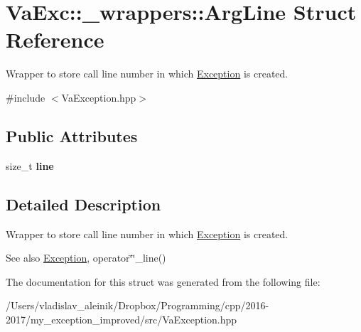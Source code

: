 \hypertarget{struct_va_exc_1_1__wrappers_1_1_arg_line}{}\section{Va\+Exc\+:\+:\+\_\+wrappers\+:\+:Arg\+Line Struct Reference}
\label{struct_va_exc_1_1__wrappers_1_1_arg_line}


Wrapper to store call line number in which \hyperlink{class_va_exc_1_1_exception}{Exception} is created.  




{\ttfamily \#include $<$Va\+Exception.\+hpp$>$}

\subsection*{Public Attributes}
\begin{DoxyCompactItemize}
\item 
\mbox{\label{struct_va_exc_1_1__wrappers_1_1_arg_line_acd4eea406c8d73c21ff7d14786ff980b}} 
size\+\_\+t {\bfseries line}
\end{DoxyCompactItemize}


\subsection{Detailed Description}
Wrapper to store call line number in which \hyperlink{class_va_exc_1_1_exception}{Exception} is created. 

\begin{DoxySeeAlso}{See also}
\hyperlink{class_va_exc_1_1_exception}{Exception}, operator\char`\"{}\char`\"{}\+\_\+line() 
\end{DoxySeeAlso}


The documentation for this struct was generated from the following file\+:\begin{DoxyCompactItemize}
\item 
/\+Users/vladislav\+\_\+aleinik/\+Dropbox/\+Programming/cpp/2016-\/2017/my\+\_\+exception\+\_\+improved/src/Va\+Exception.\+hpp\end{DoxyCompactItemize}
